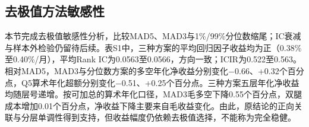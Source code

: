 \Needspace{85mm}
\subsection{去极值方法敏感性}

本节完成去极值敏感性分析，比较MAD5、MAD3与1\%/99\%分位数缩尾；IC衰减与样本外检验仍留待后续。表S1中，三种方案的平均回归因子收益均为正（0.38\%至0.40\%/月），平均Rank IC为0.0563至0.0566，方向一致；ICIR为0.522至0.563。相对MAD5，MAD3与分位数方案的多空年化净收益分别变化$-$0.66、+0.32个百分点，Q5算术年化超额分别变化$-$0.51、+0.25个百分点。三种方案五层年化净收益均随层号递增。按可加总的算术年化口径，MAD3毛多空下降0.55个百分点，双腿成本增加0.01个百分点，净收益下降主要来自毛收益变化。由此，原结论的正向关联与分层单调性得到支持，但收益幅度仍依赖去极值选择，不能称为完全稳健。
